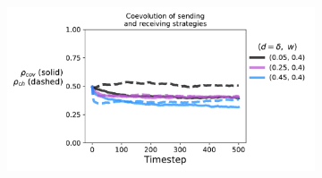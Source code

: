 \documentclass[11pt,letterpaper]{article}
\begin{document}
\begin{appendices}
\begin{figure}[H]
\begin{subfigure}{0.49\textwidth}
  \caption{}
  \end{subfigure}
  \begin{subfigure}{0.49\textwidth}
    \includegraphics[width=\textwidth]{Figures/disliking_evo_w=0p4.pdf}
  \caption{}
  \end{subfigure}
  \caption{}
  \label{fig:}
\end{figure}


\end{appendices}
\end{document}
